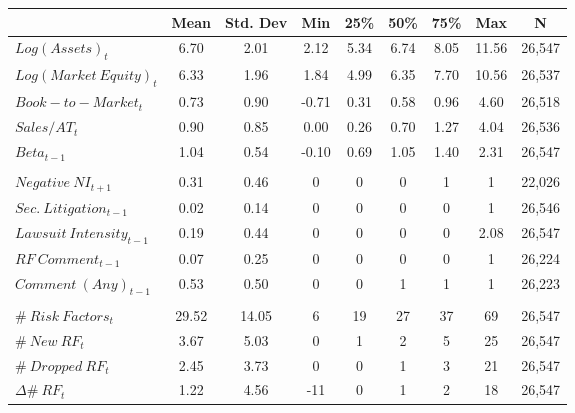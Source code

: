\begin{tabular}{l*{1}{cccccccc}} \toprule
	                                   &  Mean   & Std. Dev &  Min  & 25\%  & 50\%  &  75\%  &  Max   &   N    \\ \midrule
	$ Log(Assets)_{t} $                &  6.70   &   2.01   & 2.12  & 5.34  & 6.74  &  8.05  & 11.56  & 26,547 \\
	$ Log(Market\ Equity)_{t} $        &  6.33   &   1.96   & 1.84  & 4.99  & 6.35  &  7.70  & 10.56  & 26,537 \\
	$ Book-to-Market_{t} $             &  0.73   &   0.90   & -0.71 & 0.31  & 0.58  &  0.96  &  4.60  & 26,518 \\
	$ Sales / AT_{t} $                 &  0.90   &   0.85   & 0.00  & 0.26  & 0.70  &  1.27  &  4.04  & 26,536 \\
	$ Beta_{t-1} $                     &  1.04   &   0.54   & -0.10 & 0.69  & 1.05  &  1.40  &  2.31  & 26,547 \\ \midrule \addlinespace 
    \multicolumn{9}{c}{\normalsize Indicator and Negative Outome Variables}                                    \\ \midrule
	$ Negative\ NI_{t+1} $             &  0.31   &   0.46   &   0   &   0   &   0   &   1    &   1    & 22,026 \\
	$ Sec.\ Litigation_{t-1} $         &  0.02   &   0.14   &   0   &   0   &   0   &   0    &   1    & 26,546 \\
	$ Lawsuit\ Intensity_{t-1} $       &  0.19   &   0.44   &   0   &   0   &   0   &   0    &  2.08  & 26,547 \\
	$ RF\ Comment_{t-1} $              &  0.07   &   0.25   &   0   &   0   &   0   &   0    &   1    & 26,224 \\
	$ Comment\ (Any)_{t-1} $           &  0.53   &   0.50   &   0   &   0   &   1   &   1    &   1    & 26,223 \\ \midrule \addlinespace
    \multicolumn{9}{c}{\normalsize Textual Variables}                                                          \\ \midrule
	$ \#\ Risk\ Factors_{t} $          &  29.52  &  14.05   &   6   &  19   &  27   &   37   &   69   & 26,547 \\
	$ \#\ New\ RF_{t} $                &  3.67   &   5.03   &   0   &   1   &   2   &   5    &   25   & 26,547 \\
	$ \#\ Dropped\ RF_{t} $            &  2.45   &   3.73   &   0   &   0   &   1   &   3    &   21   & 26,547 \\
    $ \Delta \#\ RF_{t} $              &   1.22  &   4.56   & -11   &   0   &   1   &   2    &   18   & 26,547 \\ \bottomrule
\end{tabular}
